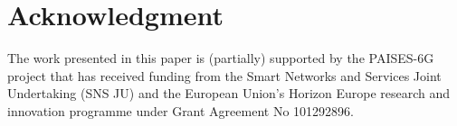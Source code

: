 \documentclass[sigconf, 10pt, anonymous, review]{acmart}
\begin{document}
\section*{Acknowledgment}
The work presented in this paper is (partially) supported by the PAISES-6G project that has received funding from the Smart Networks and Services Joint Undertaking (SNS JU) and the European Union’s Horizon Europe research and innovation programme under Grant Agreement No 101292896.




\end{document}
